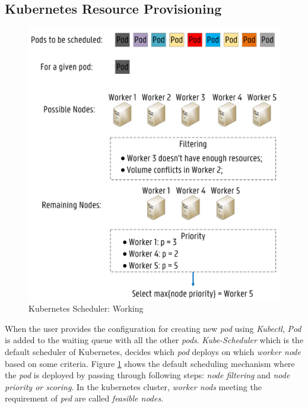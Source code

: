 \subsection{Kubernetes Resource Provisioning}
\label{sec:k8s_scheduler}
\begin{figure}
  \centering
  \includegraphics[width=\linewidth]{figures/mlcn-k8s-scheduler.pdf}
  \caption{Kubernetes Scheduler: Working\cite{Santos2019}}
  \label{fig:k8s-sch}
\end{figure}
When the user provides the configuration for creating new \emph{pod} using \emph{Kubectl}, \emph{Pod} is added to the waiting queue with all the other \emph{pods}\cite{Santos2019}. \emph{Kube-Scheduler} which is the default scheduler of Kubernetes, decides which \emph{pod} deploys on which \emph{worker node} based on some criteria. Figure \ref{fig:k8s-sch} shows the default scheduling mechanism where the \emph{pod} is deployed by passing through following steps: \emph{node filtering} and \emph{node priority or scoring}\cite{Santos2019}. In the kubernetes cluster, \emph{worker nods} meeting the requirement of \emph{ped} are called \emph{feasible nodes}\cite{k8s}.
